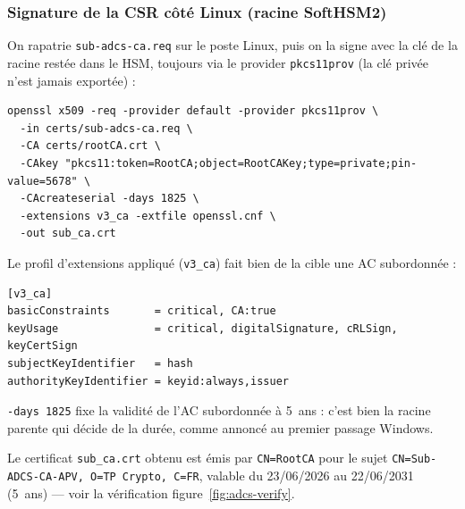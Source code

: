 \documentclass[11pt,a4paper]{article}
\newcommand{\fichier}[1]{\texttt{#1}}
\begin{document}
\subsubsection{Signature de la CSR côté Linux (racine SoftHSM2)}
On rapatrie \fichier{sub-adcs-ca.req} sur le poste Linux, puis on la signe avec la clé de
la racine restée dans le HSM, toujours via le provider \texttt{pkcs11prov} (la clé privée
n'est jamais exportée) :
\begin{lstlisting}[style=cmd]
openssl x509 -req -provider default -provider pkcs11prov \
  -in certs/sub-adcs-ca.req \
  -CA certs/rootCA.crt \
  -CAkey "pkcs11:token=RootCA;object=RootCAKey;type=private;pin-value=5678" \
  -CAcreateserial -days 1825 \
  -extensions v3_ca -extfile openssl.cnf \
  -out sub_ca.crt
\end{lstlisting}
Le profil d'extensions appliqué (\texttt{v3\_ca}) fait bien de la cible une AC subordonnée :
\begin{lstlisting}[style=conf]
[v3_ca]
basicConstraints       = critical, CA:true
keyUsage               = critical, digitalSignature, cRLSign, keyCertSign
subjectKeyIdentifier   = hash
authorityKeyIdentifier = keyid:always,issuer
\end{lstlisting}
\begin{notebox}
\texttt{-days 1825} fixe la validité de l'AC subordonnée à 5~ans : c'est bien la racine
parente qui décide de la durée, comme annoncé au premier passage Windows.
\end{notebox}
\begin{reponse}
Le certificat \fichier{sub\_ca.crt} obtenu est émis par \texttt{CN=RootCA} pour le sujet
\texttt{CN=Sub-ADCS-CA-APV, O=TP Crypto, C=FR}, valable du 23/06/2026 au 22/06/2031
(5~ans) — voir la vérification figure~\ref{fig:adcs-verify}.
\end{reponse}
\end{document}
